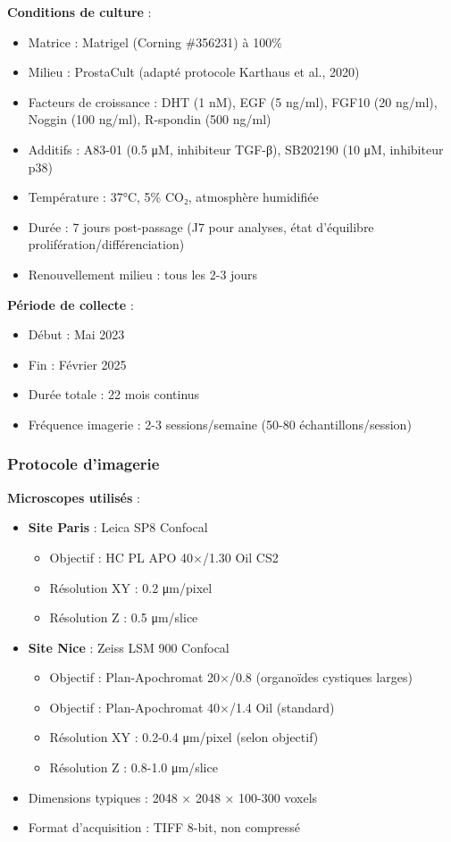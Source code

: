 \textbf{Conditions de culture} :
\begin{itemize}
    \item Matrice : Matrigel (Corning \#356231) à 100\%
    \item Milieu : ProstaCult (adapté protocole Karthaus et al., 2020)
    \item Facteurs de croissance : DHT (1 nM), EGF (5 ng/ml), FGF10 (20 ng/ml), Noggin (100 ng/ml), R-spondin (500 ng/ml)
    \item Additifs : A83-01 (0.5 μM, inhibiteur TGF-β), SB202190 (10 μM, inhibiteur p38)
    \item Température : 37°C, 5\% CO₂, atmosphère humidifiée
    \item Durée : 7 jours post-passage (J7 pour analyses, état d'équilibre prolifération/différenciation)
    \item Renouvellement milieu : tous les 2-3 jours
\end{itemize}

\textbf{Période de collecte} :
\begin{itemize}
    \item Début : Mai 2023
    \item Fin : Février 2025
    \item Durée totale : 22 mois continus
    \item Fréquence imagerie : 2-3 sessions/semaine (50-80 échantillons/session)
\end{itemize}

\subsubsection{Protocole d'imagerie}

\textbf{Microscopes utilisés} :
\begin{itemize}
    \item \textbf{Site Paris} : Leica SP8 Confocal
    \begin{itemize}
        \item Objectif : HC PL APO 40×/1.30 Oil CS2
        \item Résolution XY : 0.2 μm/pixel
        \item Résolution Z : 0.5 μm/slice
    \end{itemize}
    \item \textbf{Site Nice} : Zeiss LSM 900 Confocal
    \begin{itemize}
        \item Objectif : Plan-Apochromat 20×/0.8 (organoïdes cystiques larges)
        \item Objectif : Plan-Apochromat 40×/1.4 Oil (standard)
        \item Résolution XY : 0.2-0.4 μm/pixel (selon objectif)
        \item Résolution Z : 0.8-1.0 μm/slice
    \end{itemize}
    \item Dimensions typiques : 2048 × 2048 × 100-300 voxels
    \item Format d'acquisition : TIFF 8-bit, non compressé
\end{itemize}

